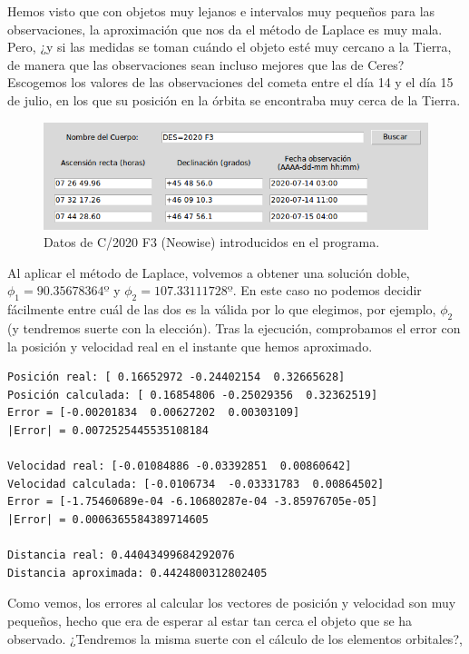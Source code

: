 Hemos visto que con objetos muy lejanos e intervalos muy pequeños para las observaciones, la aproximación que nos da el método de Laplace es muy mala. Pero, ¿y si las medidas se toman cuándo el objeto esté muy cercano a la Tierra, de manera que las observaciones sean incluso mejores que las de Ceres?\\

Escogemos los valores de las observaciones del cometa entre el día 14 y el día 15 de julio, en los que su posición en la órbita se encontraba muy cerca de la Tierra.
\begin{figure}[H]
\centering
\includegraphics[scale=0.5]{images/neowise_exp.png}
\caption{Datos de C/2020 F3 (Neowise) introducidos en el programa.}
\label{fig:neowise_exp}
\end{figure}

Al aplicar el método de Laplace, volvemos a obtener una solución doble, $\phi_1=90.35678364º$ y $\phi_2=107.33111728º$. En este caso no podemos decidir fácilmente entre cuál de las dos es la válida por lo que elegimos, por ejemplo, $\phi_2$ (y tendremos suerte con la elección). Tras la ejecución, comprobamos el error con la posición y velocidad real en el instante que hemos aproximado.
\begin{lstlisting}[style=Console]
Posición real: [ 0.16652972 -0.24402154  0.32665628]
Posición calculada: [ 0.16854806 -0.25029356  0.32362519]
Error = [-0.00201834  0.00627202  0.00303109]
|Error| = 0.0072525445535108184

Velocidad real: [-0.01084886 -0.03392851  0.00860642]
Velocidad calculada: [-0.0106734  -0.03331783  0.00864502]
Error = [-1.75460689e-04 -6.10680287e-04 -3.85976705e-05]
|Error| = 0.0006365584389714605

Distancia real: 0.44043499684292076
Distancia aproximada: 0.4424800312802405
\end{lstlisting}

Como vemos, los errores al calcular los vectores de posición y velocidad son muy pequeños, hecho que era de esperar al estar tan cerca el objeto que se ha observado. ¿Tendremos la misma suerte con el cálculo de los elementos orbitales?,\\

